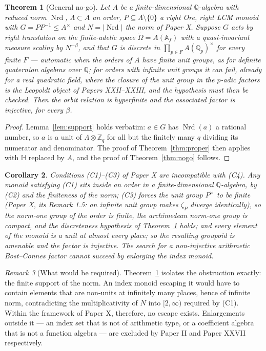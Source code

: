 \documentclass[11pt]{amsart}
\numberwithin{equation}{section}
\newtheorem{theorem}{Theorem}[section]
\newtheorem{corollary}[theorem]{Corollary}
\theoremstyle{definition}
\theoremstyle{remark}
\newtheorem{remark}[theorem]{Remark}
\newcommand{\Z}{\mathbb{Z}}
\newcommand{\Q}{\mathbb{Q}}
\newcommand{\HH}{\mathbb{H}}
\newcommand{\Nrd}{\operatorname{Nrd}}
\newcommand{\A}{\mathbb{A}}
\begin{document}
\begin{theorem}[General no-go]\label{thm:general}
Let $A$ be a finite-dimensional $\Q$-algebra with reduced norm $\Nrd$, $\Lambda\subset A$ an
order, $P\subseteq\Lambda\setminus\{0\}$ a right Ore, right LCM monoid with $G=PP^{-1}\le A^\times$
and $N=|\Nrd|$ the norm of Paper X. Suppose $G$ acts by right translation on the finite-adelic
space $\widetilde\Omega=A(\A_f)$ with a quasi-invariant measure scaling by $N^{-\beta}$, and that
$G$ is discrete in $\prod_{p\in F}A(\Q_p)^\times$ for every finite $F$ --- automatic when
the orders of $A$ have finite unit groups, as for definite quaternion algebras over $\Q$;
for orders with infinite unit groups it can fail, already for a real quadratic field, where
the closure of the unit group in the $p$-adic factors is the Leopoldt object of Papers
XXII--XXIII, and the hypothesis must then be checked. Then the
orbit relation is hyperfinite and the associated factor is injective, for every $\beta$.
\end{theorem}

\begin{proof}
Lemma~\ref{lem:support} holds verbatim: $a\in G$ has $\Nrd(a)$ a rational number, so $a$ is a unit
of $\Lambda\otimes\Z_q$ for all but the finitely many $q$ dividing its numerator and denominator.
The proof of Theorem~\ref{thm:proper} then applies with $\HH$ replaced by $A$, and the proof of
Theorem~\ref{thm:nogo} follows.
\end{proof}

\begin{corollary}\label{cor:closed}
Conditions (C1)--(C3) of Paper X are incompatible with (C4). Any monoid satisfying (C1) sits inside
an order in a finite-dimensional $\Q$-algebra, by (C2) and the finiteness of the norm; (C3)
forces the unit group $P^\times$ to be finite (Paper X, its Remark 1.5: an infinite unit
group makes $\zeta_P$ diverge identically), so the norm-one group of the order is finite,
the archimedean norm-one group is compact, and the discreteness hypothesis of
Theorem~\ref{thm:general} holds; and every
element of the monoid is a unit at almost every place; so the resulting groupoid is amenable and the factor
is injective. The search for a non-injective arithmetic Bost--Connes factor cannot succeed by
enlarging the index monoid.
\end{corollary}

\begin{remark}[What would be required]\label{rem:escape}
Theorem~\ref{thm:general} isolates the obstruction exactly: the finite support of the norm. An
index monoid escaping it would have to contain elements that are non-units at infinitely many
places, hence of infinite norm, contradicting the multiplicativity of $N$ into $[2,\infty)$
required by (C1). Within the framework of Paper X, therefore, no escape exists. Enlargements
outside it --- an index set that is not of arithmetic type, or a coefficient algebra that is not a
function algebra --- are excluded by Paper II and Paper XXVII respectively.
\end{remark}
\end{document}
